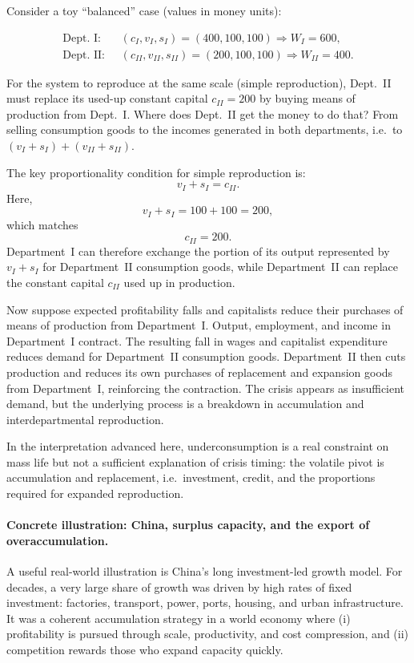 \begin{example}
Consider a toy “balanced” case (values in money units):

\begin{align*}
\text{Dept.\ I: } \;&(c_I,v_I,s_I)=(400,100,100) \Rightarrow W_I=600,\\
\text{Dept.\ II: } \;&(c_{II},v_{II},s_{II})=(200,100,100) \Rightarrow W_{II}=400.
\end{align*}

For the system to reproduce at the same scale (simple reproduction), Dept.\ II must replace its
used-up constant capital $c_{II}=200$ by buying means of production from Dept.\ I.
Where does Dept.\ II get the money to do that? From selling consumption goods to the incomes
generated in both departments, i.e.\ to $(v_I+s_I)+(v_{II}+s_{II})$.

The key proportionality condition for simple reproduction is:
\[
v_I+s_I=c_{II}.
\]
Here,
\[
v_I+s_I=100+100=200,
\]
which matches
\[
c_{II}=200.
\]
Department~I can therefore exchange the portion of its output represented by
\(v_I+s_I\) for Department~II consumption goods, while Department~II can
replace the constant capital \(c_{II}\) used up in production.

Now suppose expected profitability falls and capitalists reduce their purchases
of means of production from Department~I. Output, employment, and income in
Department~I contract. The resulting fall in wages and capitalist expenditure
reduces demand for Department~II consumption goods. Department~II then cuts
production and reduces its own purchases of replacement and expansion goods
from Department~I, reinforcing the contraction. The crisis appears as
insufficient demand, but the underlying process is a breakdown in accumulation
and interdepartmental reproduction.
\end{example}

In the interpretation advanced here, underconsumption is a real constraint on mass life but not a sufficient explanation of crisis timing: the volatile pivot is accumulation and replacement, i.e.\ investment,
credit, and the proportions required for expanded reproduction.

\paragraph{Concrete illustration: China, surplus capacity, and the export of overaccumulation.}
A useful real-world illustration is China’s long investment-led growth model.
For decades, a very large share of growth was driven by high rates of fixed investment:
factories, transport, power, ports, housing, and urban infrastructure.
It was a coherent accumulation strategy in a
world economy where (i) profitability is pursued through scale, productivity, and cost
compression, and (ii) competition rewards those who expand capacity quickly.

